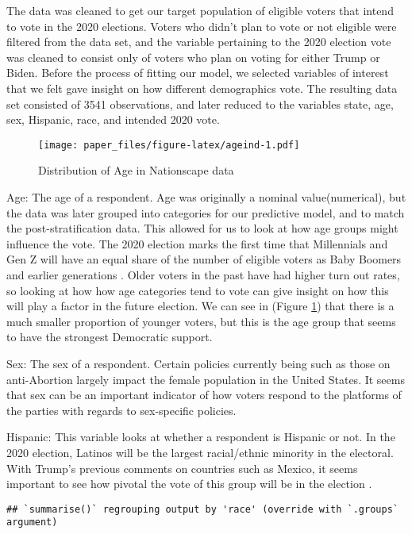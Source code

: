 \documentclass[
]{article}
\begin{document}
The data was cleaned to get our target population of eligible voters that intend to vote in the 2020 elections. Voters who didn't plan to vote or not eligible were filtered from the data set, and the variable pertaining to the 2020 election vote was cleaned to consist only of voters who plan on voting for either Trump or Biden. Before the process of fitting our model, we selected variables of interest that we felt gave insight on how different demographics vote. The resulting data set consisted of 3541 observations, and later reduced to the variables state, age, sex, Hispanic, race, and intended 2020 vote.

\begin{figure}
\centering
\texttt{[image: paper\_files/figure-latex/ageind-1.pdf]}
\caption{\label{fig:ageind}Distribution of Age in Nationscape data}
\end{figure}

Age: The age of a respondent. Age was originally a nominal value(numerical), but the data was later grouped into categories for our predictive model, and to match the post-stratification data. This allowed for us to look at how age groups might influence the vote. The 2020 election marks the first time that Millennials and Gen Z will have an equal share of the number of eligible voters as Baby Boomers and earlier generations \citep{agearticle} . Older voters in the past have had higher turn out rates, so looking at how how age categories tend to vote can give insight on how this will play a factor in the future election. We can see in (Figure \ref{fig:ageind}) that there is a much smaller proportion of younger voters, but this is the age group that seems to have the strongest Democratic support.

Sex: The sex of a respondent. Certain policies currently being such as those on anti-Abortion largely impact the female population in the United States. It seems that sex can be an important indicator of how voters respond to the platforms of the parties with regards to sex-specific policies.

Hispanic: This variable looks at whether a respondent is Hispanic or not. In the 2020 election, Latinos will be the largest racial/ethnic minority in the electoral. With Trump's previous comments on countries such as Mexico, it seems important to see how pivotal the vote of this group will be in the election \citep{citeBBC}.

\begin{verbatim}
## `summarise()` regrouping output by 'race' (override with `.groups` argument)
\end{verbatim}
\end{document}

